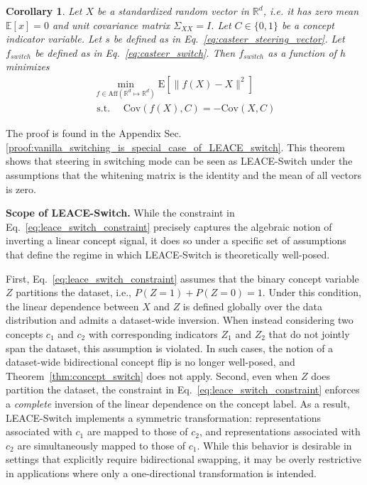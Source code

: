 \documentclass{article}
\theoremstyle{plain}
\newtheorem{corollary}[theorem]{Corollary}
\theoremstyle{definition}
\theoremstyle{remark}
\newcommand{\cov}{\mathrm{Cov}}
\begin{document}
\begin{corollary}
    \label{thm:concept_flipping_simple_form}
    Let $X$ be a standardized random vector in $\mathbb{R}^d$, i.e. it has zero mean $\mathbb{E}[x] = 0$ and unit covariance matrix $\Sigma_{XX} = I$. Let $C \in \{0, 1\}$ be a concept indicator variable.
    Let $s$ be defined as in Eq.~\ref{eq:casteer_steering_vector}.
    Let $f_{switch}$ be defined as in Eq.~\ref{eq:casteer_switch}.
    Then $f_{switch}$ as a function of $h$ minimizes
\begin{align}
    \min_{f \in \mathrm{Aff}(\mathbb{R}^d \mapsto \mathbb{R}^d)} \mathrm{E}[\lVert{f(X) - X}\rVert^2] \quad \\ 
    \text{ s.t. } \quad \cov(f(X), C) = -\cov(X, C)
\end{align}
\end{corollary}
The proof is found in the Appendix Sec. \ref{proof:vanilla_switching_is_special_case_of_LEACE_switch}.
%
This theorem shows that steering in switching mode can be seen as LEACE-Switch under the assumptions that the whitening matrix is the identity and the mean of all vectors is zero. 
	
\textbf{Scope of LEACE-Switch.}
While the constraint in Eq.~\ref{eq:leace_switch_constraint} precisely captures the algebraic notion of inverting a linear concept signal, it does so under a specific set of assumptions that define the regime in which LEACE-Switch is theoretically well-posed.

First, Eq.~\ref{eq:leace_switch_constraint} assumes that the binary concept variable $Z$ partitions the dataset, i.e.,
$P(Z = 1) + P(Z = 0) = 1.$
Under this condition, the linear dependence between $X$ and $Z$ is defined globally over the data distribution and admits a dataset-wide inversion. When instead considering two concepts $c_1$ and $c_2$ with corresponding indicators $Z_1$ and $Z_2$ that do not jointly span the dataset, this assumption is violated. In such cases, the notion of a dataset-wide bidirectional concept flip is no longer well-posed, and Theorem~\ref{thm:concept_switch} does not apply.
%
Second, even when $Z$ does partition the dataset, the constraint in Eq.~\ref{eq:leace_switch_constraint} enforces a \emph{complete} inversion of the linear dependence on the concept label. As a result, LEACE-Switch implements a symmetric transformation: representations associated with $c_1$ are mapped to those of $c_2$, and representations associated with $c_2$ are simultaneously mapped to those of $c_1$. While this behavior is desirable in settings that explicitly require bidirectional swapping, it may be overly restrictive in applications where only a one-directional transformation is intended.
\end{document}
